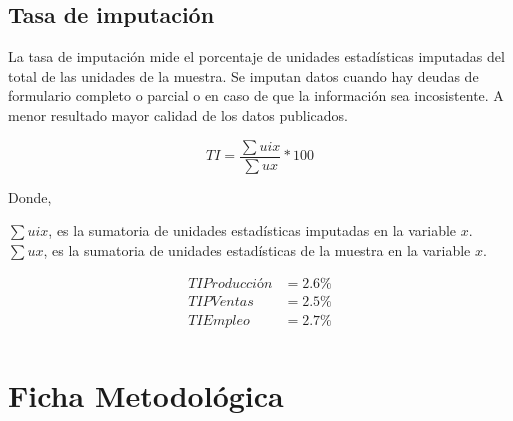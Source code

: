 \documentclass[
]{article}
\begin{document}
\hypertarget{tasa-de-imputaciuxf3n}{%
\subsection{Tasa de imputación}\label{tasa-de-imputaciuxf3n}}

La tasa de imputación mide el porcentaje de unidades estadísticas
imputadas del total de las unidades de la muestra. Se imputan datos
cuando hay deudas de formulario completo o parcial o en caso de que la
información sea incosistente. A menor resultado mayor calidad de los
datos publicados.

\begin{equation*}
TI = \frac{\sum uix}{\sum ux}*100
\end{equation*}

Donde,

\(\sum uix\), es la sumatoria de unidades estadísticas imputadas en la
variable \(x\).\\
\(\sum ux\), es la sumatoria de unidades estadísticas de la muestra en
la variable \(x\).

\begin{align*}
TIProducción &= 2.6 \%\\
TIPVentas &= 2.5 \%\\
TIEmpleo &= 2.7\%\\
\end{align*}

\hypertarget{ficha-metodoluxf3gica}{%
\section{Ficha Metodológica}\label{ficha-metodoluxf3gica}}
\end{document}
